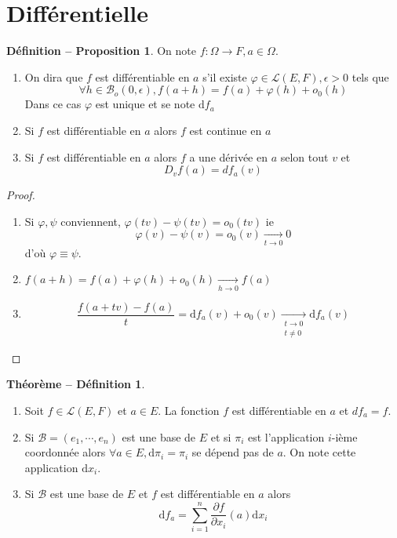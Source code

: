 \documentclass{article}
\theoremstyle{definition}
\newtheorem*{thmdef}{Théorème -- Définition}
\newtheorem*{defprop}{Définition -- Proposition}
\begin{document}
\section{Différentielle}

\begin{defprop}
On note $f:\Omega\longrightarrow F, a\in \Omega$. \begin{enumerate}
    \item On dira que $f$ est différentiable en $a$ s'il existe $\varphi\in\mathcal L(E, F), \epsilon>0$ tels que \[
        \forall h\in\mathcal B_o(0, \epsilon), f(a+h)=f(a)+\varphi(h)+o_0(h)
    \]
    Dans ce cas $\varphi$ est unique et se note $\mathrm df_a$
    \item Si $f$ est différentiable en $a$ alors $f$ est continue en $a$
    \item Si $f$ est différentiable en $a$ alors $f$ a une dérivée en $a$ selon tout $v$ et \[
        D_vf(a)=df_a(v)
    \]
\end{enumerate}
\end{defprop}

\begin{proof} ~
\begin{enumerate}
    \item Si $\varphi, \psi$ conviennent, $\varphi(tv)-\psi(tv)=o_0(tv)$ ie \[
        \varphi(v)-\psi(v)=o_0(v)\xrightarrow[t\to 0]{}0
    \]
    d'où $\varphi\equiv \psi$.
    \item $f(a+h)=f(a)+\varphi(h)+o_0(h)\xrightarrow[h\to 0]{}f(a)$
    \item \[
        \frac{f(a+tv)-f(a)}{t}=\mathrm df_a(v)+o_0(v)\xrightarrow[\substack{t\to 0\\t\neq 0}]{}\mathrm df_a(v)
    \]
\end{enumerate}
\end{proof}

\begin{thmdef}
~ \begin{enumerate}
    \item Soit $f\in\mathcal L(E, F)$ et $a\in E$. La fonction $f$ est différentiable en $a$ et $df_a=f$.
    \item Si $\mathcal B=(e_1, \cdots, e_n)$ est une base de $E$ et si $\pi_i$ est l'application $i$-ième coordonnée alors $\forall a\in E, \mathrm d\pi_i=\pi_i$ se dépend pas de $a$. On note cette application $\mathrm dx_i$.
    \item Si $\mathcal B$ est une base de $E$ et $f$ est différentiable en $a$ alors \[
        \mathrm df_a=\sum_{i=1}^n\frac{\partial f}{\partial x_i}(a)\mathrm dx_i
    \]
\end{enumerate}
\end{thmdef}
\end{document}
